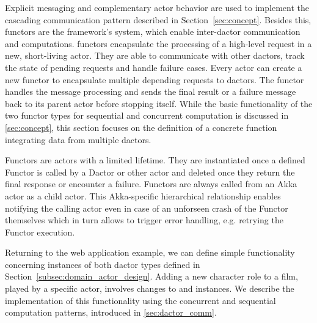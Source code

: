     Explicit messaging and complementary actor behavior are used to implement the cascading communication pattern described in Section~\ref{sec:concept}.
    Besides this, \glspl{functor} are the framework's system, which enable inter-\gls{dactor} communication and computations.
    \Glspl{functor} encapsulate the processing of a high-level request in a new, short-living actor.
    They are able to communicate with other \glspl{dactor}, track the state of pending requests and handle failure cases.
    Every actor can create a new \gls{functor} to encapsulate multiple depending requests to \glspl{dactor}.
    The \gls{functor} handles the message processing and sends the final result or a failure message back to its parent actor before stopping itself.
    While the basic functionality of the two \gls{functor} types for sequential and concurrent computation is discussed in \cref{sec:concept}, this section focuses on the definition of a concrete function integrating data from multiple \glspl{dactor}.
    
    Functors are actors with a limited lifetime.
    They are instantiated once a defined Functor is called by a Dactor or other actor and deleted once they return the final response or encounter a failure.
    Functors are always called from an Akka actor as a child actor.
    This Akka-specific hierarchical relationship enables notifying the calling actor even in case of an unforseen crash of the Functor themselves which in turn allows to trigger error handling, e.g. retrying the Functor execution.
    
    Returning to the web application example, we can define simple functionality concerning instances of both \gls{dactor} types defined in Section~\ref{subsec:domain_actor_design}.
    Adding a new character role to a film, played by a specific actor, involves changes to  and  instances.
    We describe the implementation of this functionality using the concurrent and sequential computation patterns, introduced in \cref{sec:dactor_comm}.
    
